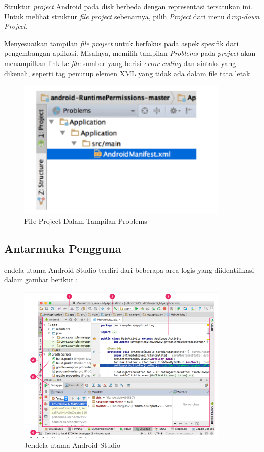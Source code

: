\par Struktur \textit{project} Android pada disk berbeda dengan representasi tersatukan ini. Untuk melihat struktur \textit{file project} sebenarnya, pilih \textit{Project} dari menu d\textit{rop-down Project}.

\par Menyesuaikan tampilan\textit{ file project} untuk berfokus pada aspek spesifik dari pengembangan aplikasi. Misalnya, memilih tampilan \textit{Problems} pada \textit{project} akan menampilkan link ke \textit{file} sumber yang berisi \textit{error coding} dan sintaks yang dikenali, seperti tag penutup elemen XML yang tidak ada dalam file tata letak.
\begin{figure}[H]
    \centering
    \includegraphics[width=0.9\textwidth]{figures/android5.png}
    \caption{ File Project Dalam Tampilan Problems}
    \label{print}
    \end{figure}
\subsection{Antarmuka Pengguna}
\par endela utama Android Studio terdiri dari beberapa area logis yang diidentifikasi dalam gambar berikut :
\begin{figure}[H]
    \centering
    \includegraphics[width=0.9\textwidth]{figures/android6.png}
    \caption{ Jendela utama Android Studio}
    \label{print}
    \end{figure}

